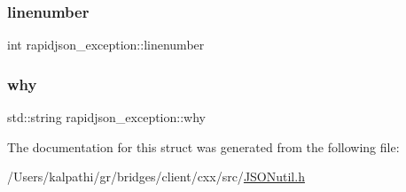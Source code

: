 \mbox{\label{structrapidjson__exception_a9c0263f853d8a17911e29cae66708e67}} 
\subsubsection{\texorpdfstring{linenumber}{linenumber}}
{\footnotesize\ttfamily int rapidjson\+\_\+exception\+::linenumber}

\mbox{\label{structrapidjson__exception_a6b432b89bd7052332bc923f274249e1e}} 
\subsubsection{\texorpdfstring{why}{why}}
{\footnotesize\ttfamily std\+::string rapidjson\+\_\+exception\+::why}



The documentation for this struct was generated from the following file\+:\begin{DoxyCompactItemize}
\item 
/\+Users/kalpathi/gr/bridges/client/cxx/src/\mbox{\hyperlink{_j_s_o_nutil_8h}{J\+S\+O\+Nutil.\+h}}\end{DoxyCompactItemize}
